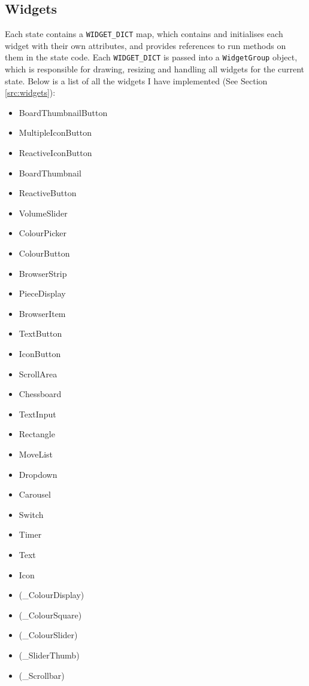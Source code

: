 \documentclass[../main/main.tex]{subfiles}
\begin{document}
\subsection{Widgets}
\label{sec:widgets}
Each state contains a \lstinline{WIDGET_DICT} map, which contains and initialises each widget with their own attributes, and provides references to run methods on them in the state code. Each \lstinline{WIDGET_DICT} is passed into a \lstinline{WidgetGroup} object, which is responsible for drawing, resizing and handling all widgets for the current state.
Below is a list of all the widgets I have implemented (See Section \ref{src:widgets}):

\begin{multicols}{3}
\begin{itemize}
\item BoardThumbnailButton
\item MultipleIconButton
\item ReactiveIconButton
\item BoardThumbnail
\item ReactiveButton
\item VolumeSlider
\item ColourPicker
\item ColourButton
\item BrowserStrip
\item PieceDisplay
\item BrowserItem
\item TextButton
\item IconButton
\item ScrollArea
\item Chessboard
\item TextInput
\item Rectangle
\item MoveList
\item Dropdown
\item Carousel
\item Switch
\item Timer
\item Text
\item Icon
\item (\_ColourDisplay)
\item (\_ColourSquare)
\item (\_ColourSlider)
\item (\_SliderThumb)
\item (\_Scrollbar)
\end{itemize}
\end{multicols}
\end{document}
